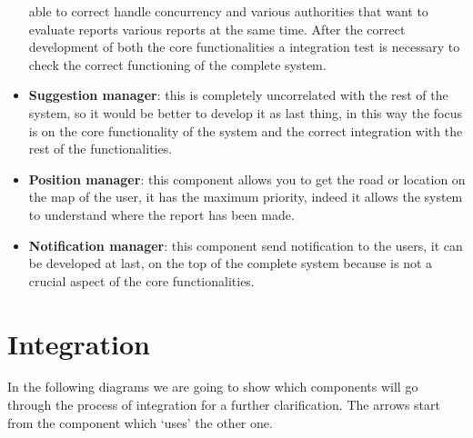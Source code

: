 \documentclass[12pt,a4paper]{report}
\begin{document}
\begin{itemize}
					able to correct handle concurrency and various authorities that want to evaluate reports various
					reports at the same time. After the correct development of both the core functionalities a integration
					test is necessary to check the correct functioning of the complete system.  
				\item \textbf{Suggestion manager}: this is completely uncorrelated with the rest of the system, so it would be
					better to develop it as last thing, in this way the focus is on the core functionality of the system and
					the correct integration with the rest of the functionalities.
				\item \textbf{Position manager}: this component allows you to get the road or location on the map of the
					user, it has the maximum priority, indeed it allows the system to understand where the report has been
					made.
				\item \textbf{Notification manager}: this component send notification to the users, it can be developed at
					last, on the top of the complete system because is not a crucial aspect of the core functionalities.
			\end{itemize}
		\section{Integration}
			In the following diagrams we are going to show which components will go through the process of 
			integration for a further clarification. The arrows start from the component which ‘uses’ the other one.
\end{document}
